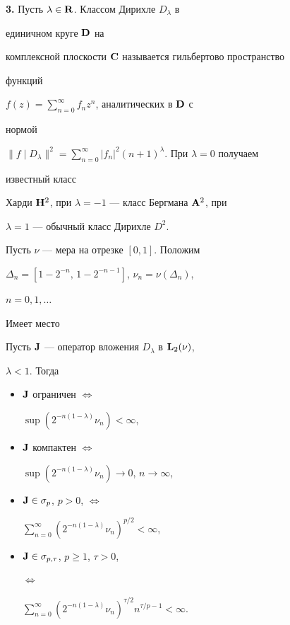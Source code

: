 {\bf 3.} Пусть $\lambda\in\bold R$. Классом Дирихле $D_\lambda$ в


единичном круге $\bold D$ на


комплексной плоскости $\bold C$ называется гильбертово пространство


функций


$f(z)=\sum\limits^\infty_{n=0}f_n z^n$, аналитических в $\bold D$ с


нормой


$\|f\mid D_\lambda\|^2=\sum\limits^\infty_{n=0}|f_n|^2


(n+1)^\lambda$. При $\lambda=0$ получаем


известный класс


Харди $\bold H^2$, при $\lambda=-1$ --- класс Бергмана $\bold A^2$, при


$\lambda=1$ --- обычный класс Дирихле $D^2$.





Пусть $\nu$ --- мера на отрезке $[0,1]$. Положим


$\Delta_n=[1-2^{-n},\,1-2^{-n-1}]$, $\nu_n=\nu(\Delta_n)$,


$n=0,1,\dotsc$





Имеет место





\begin{thm}


Пусть $\bold J$ --- оператор вложения $D_\lambda$ в $\bold L_2(\nu)$,


$\lambda<1$. Тогда


\begin{itemize}


\item[а)] $\bold J$ ограничен $\Longleftrightarrow$


$\sup(2^{-n(1-\lambda)}\nu_n)<\infty$,


\item[б)] $\bold J$ компактен $\Longleftrightarrow$


$\sup(2^{-n(1-\lambda)}\nu_n)\to 0$, $n\to\infty$,


\item[в)] $\bold J\in\sigma_p$, $p>0$, $\Longleftrightarrow$


$\sum\limits^\infty_{n=0}(2^{-n(1-\lambda)}\nu_n)^{p/2}<\infty$,


\item[г)] $\bold J\in\sigma_{p,\tau}$, $p\ge 1$, $\tau>0$,


$\Longleftrightarrow$


$\sum\limits^\infty_{n=0}


(2^{-n(1-\lambda)}\nu_n)^{\tau/2}n^{\tau/p-1}<\infty$.


\end{itemize}


\end{thm}






